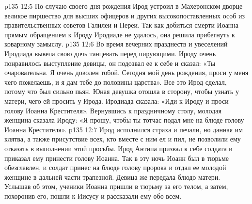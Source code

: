 \vs p135 12:5 \pc По случаю своего дня рождения Ирод устроил в Махеронском дворце великое пиршество для высших офицеров и других высокопоставленных особ из правительственных советов Галилеи и Переи. Так как добиться смерти Иоанна прямым обращением к Ироду Иродиаде не удалось, она решила прибегнуть к коварному замыслу.
\vs p135 12:6 Во время вечерних празднеств и увеселений Иродиада вывела свою дочь танцевать перед пирующими. Ироду очень понравилось выступление девицы, он подозвал ее к себе и сказал: «Ты очаровательна. Я очень доволен тобой. Сегодня мой день рождения, проси у меня чего пожелаешь, и я дам тебе до половины царства». Все это Ирод сделал, потому что был сильно пьян. Юная девушка отошла в сторону, чтобы узнать у матери, чего ей просить у Ирода. Иродиада сказала: «Иди к Ироду и проси голову Иоанна Крестителя». Вернувшись к праздничному столу, молодая женщина сказала Ироду: «Я прошу, чтобы ты тотчас подал мне на блюде голову Иоанна Крестителя».
\vs p135 12:7 Ирод исполнился страха и печали, но данная им клятва, а также присутствие всех, кто вместе с ним ел и пил, не позволили ему отказать в выполнении этой просьбы. Ирод Антипа призвал к себе солдата и приказал ему принести голову Иоанна. Так в эту ночь Иоанн был в тюрьме обезглавлен, и солдат принес на блюде голову пророка и отдал ее молодой женщине в дальней части трапезной. Девица же передала блюдо матери. Услышав об этом, ученики Иоанна пришли в тюрьму за его телом, а затем, похоронив его, пошли к Иисусу и рассказали ему обо всем.
